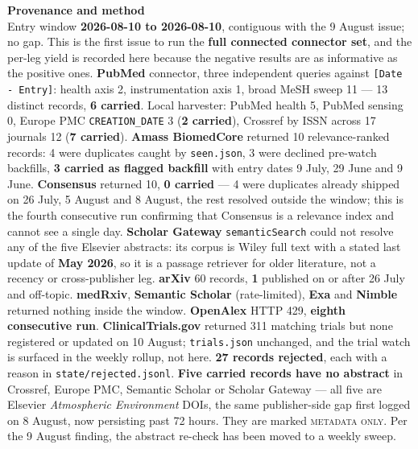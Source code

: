 \documentclass[10pt]{article}
\begin{document}
\vspace{4mm}
\begin{keybox}
{\sffamily\bfseries\footnotesize\color{Deep}Provenance and method}\\[1.2mm]
{\fontsize{7.2}{8.8}\selectfont
Entry window \textbf{2026-08-10 to 2026-08-10}, contiguous with the 9 August issue; no
gap. This is the first issue to run the \textbf{full connected connector set}, and the
per-leg yield is recorded here because the negative results are as informative as the
positive ones. \textbf{PubMed} connector, three independent queries against
\texttt{[Date - Entry]}: health axis 2, instrumentation axis 1, broad MeSH sweep 11 --- 13
distinct records, \textbf{6 carried}. Local harvester: PubMed health 5, PubMed sensing 0,
Europe PMC \texttt{CREATION\_DATE} 3 (\textbf{2 carried}), Crossref by ISSN across 17
journals 12 (\textbf{7 carried}). \textbf{Amass BiomedCore} returned 10 relevance-ranked
records: 4 were duplicates caught by \texttt{seen.json}, 3 were declined pre-watch
backfills, \textbf{3 carried as flagged backfill} with entry dates 9 July, 29 June and
9 June. \textbf{Consensus} returned 10, \textbf{0 carried} --- 4 were duplicates already
shipped on 26 July, 5 August and 8 August, the rest resolved outside the window; this is
the fourth consecutive run confirming that Consensus is a relevance index and cannot see a
single day. \textbf{Scholar Gateway} \texttt{semanticSearch} could not resolve any of the
five Elsevier abstracts: its corpus is Wiley full text with a stated last update of
\textbf{May 2026}, so it is a passage retriever for older literature, not a recency or
cross-publisher leg. \textbf{arXiv} 60 records, \textbf{1} published on or after 26 July
and off-topic. \textbf{medRxiv}, \textbf{Semantic Scholar} (rate-limited),
\textbf{Exa} and \textbf{Nimble} returned nothing inside the window. \textbf{OpenAlex}
HTTP 429, \textbf{eighth consecutive run}. \textbf{ClinicalTrials.gov} returned 311
matching trials but none registered or updated on 10 August; \texttt{trials.json}
unchanged, and the trial watch is surfaced in the weekly rollup, not here.
\textbf{27 records rejected}, each with a reason in \texttt{state/rejected.jsonl}.
\textbf{Five carried records have no abstract} in Crossref, Europe PMC, Semantic Scholar
or Scholar Gateway --- all five are Elsevier \textit{Atmospheric Environment} DOIs, the
same publisher-side gap first logged on 8 August, now persisting past 72 hours. They are
marked \textsc{metadata only}. Per the 9 August finding, the abstract re-check has been
moved to a weekly sweep.
}
\end{keybox}
\end{document}
